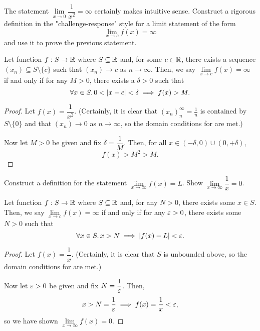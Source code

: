 \begin{problem}
  The statement $\lim\limits_{x \to 0} \dfrac{1}{x^{2}} = \infty$ certainly makes
  intuitive sense. Construct a rigorous definition in the "challenge-response"
  style for a limit statement of the form
    \[
      \lim_{x \to c} f(x) = \infty
    \]
  and use it to prove the previous statement.

  \begin{definition}
    \label{def:limit-to-infty-x-to-finite-real}
    Let function $f : S \to \mathbb{R}$ where $S \subseteq \mathbb{R}$ and, for some $c \in \mathbb{R}$, there exists a
    sequence $(x_{n}) \subseteq S \setminus \{ c \}$ such that $(x_{n}) \to c$ as $n \to \infty$.
    Then, we say $\lim\limits_{x \to c} f(x) = \infty$ if and only if for any
    $M > 0$, there exists a $\delta > 0$ such that
    \[
      \forall x \in S.\, 0 < \left\lvert x - c \right\rvert < \delta \implies f(x) > M.
    \]
  \end{definition}

  \begin{proof}
    Let $f(x) = \dfrac{1}{x^{2}}$. (Certainly, it is clear that
    $(x_{n})_{n}^{\infty} = \frac{1}{n}$ is contained by $S \setminus \{ 0 \}$
    and that $(x_{n}) \to 0$ as $n \to \infty$, so the domain conditions for 
     are met.)

    Now let $M > 0$ be given and fix $\delta = \dfrac{1}{M}$. 
    Then, for all $x \in (-\delta, 0) \cup (0, +\delta)$,
    \[
        f(x) > M^{2} > M.
    \]
  \end{proof}

\end{problem}

\begin{problem}
  Construct a definition for the statement $\lim\limits_{x \to \infty} f(x) = L$.
  Show $\lim\limits_{x \to \infty} \dfrac{1}{x} = 0$.

  \begin{definition}
    \label{def:limit-to-finite-real-x-to-infinite}
    Let function $f : S \to \mathbb{R}$ where $S \subseteq \mathbb{R}$ and, for any $N > 0$, there 
    exists some $x \in S$.
    Then, we say $\lim\limits_{x \to c} f(x) = \infty$ if and only if for any
    $\varepsilon > 0$, there exists some $N > 0$ such that
    \[
      \forall x \in S.\, x > N \implies \left\lvert f(x) - L \right\rvert < \varepsilon.
    \]
  \end{definition}

  \begin{proof}
    Let $f(x) = \dfrac{1}{x}$. (Certainly, it is clear that $S$ is unbounded
    above, so the domain conditions for
     are met.)

    Now let $\varepsilon > 0$ be given and fix $N = \dfrac{1}{\varepsilon}$. 
    Then,
    \[
      x > N = \frac{1}{\varepsilon} \implies f(x) = \frac{1}{x} < \varepsilon,
    \]
    so we have shown $\lim\limits_{x \to \infty} f(x) = 0$.
  \end{proof}

\end{problem}

